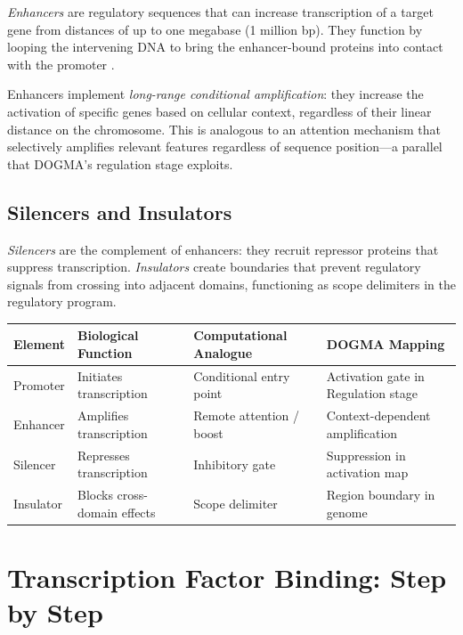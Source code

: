 \emph{Enhancers} are regulatory sequences that can increase transcription of a target gene from distances of up to one megabase (1 million bp). They function by looping the intervening DNA to bring the enhancer-bound proteins into contact with the promoter \citep{encode2012}.

Enhancers implement \emph{long-range conditional amplification}: they increase the activation of specific genes based on cellular context, regardless of their linear distance on the chromosome. This is analogous to an attention mechanism that selectively amplifies relevant features regardless of sequence position---a parallel that DOGMA's regulation stage exploits.

\subsection{Silencers and Insulators}

\emph{Silencers} are the complement of enhancers: they recruit repressor proteins that suppress transcription. \emph{Insulators} create boundaries that prevent regulatory signals from crossing into adjacent domains, functioning as scope delimiters in the regulatory program.

\begin{center}
\renewcommand{\arraystretch}{1.15}
\begin{tabularx}{0.95\textwidth}{L{2.5cm} L{3cm} L{3cm} Y}
\toprule
\textbf{Element} & \textbf{Biological Function} & \textbf{Computational Analogue} & \textbf{DOGMA Mapping} \\
\midrule
Promoter & Initiates transcription & Conditional entry point & Activation gate in Regulation stage \\
Enhancer & Amplifies transcription & Remote attention / boost & Context-dependent amplification \\
Silencer & Represses transcription & Inhibitory gate & Suppression in activation map \\
Insulator & Blocks cross-domain effects & Scope delimiter & Region boundary in genome \\
\bottomrule
\end{tabularx}
\end{center}

\section{Transcription Factor Binding: Step by Step}
\label{sec:tf-binding}

